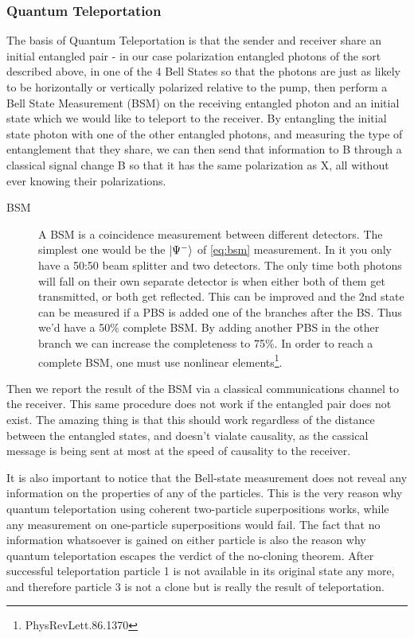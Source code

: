 \documentclass{article}
\begin{document}
\subsubsection{Quantum Teleportation}
The basis of Quantum Teleportation is that the sender and receiver share an initial entangled pair -
in our case polarization entangled photons of the sort described above, in one of the 4 Bell States
so that the photons are just as likely to be horizontally or vertically polarized relative to the pump,
then perform a Bell State Measurement (BSM) on the receiving entangled 
photon and an initial state which we would like to teleport to the receiver. 
By entangling the initial state photon with one of the other entangled photons, and measuring the type of entanglement that they
share, we can then send that information to B through a classical signal change B so that it has the same polarization as X,
all without ever knowing their polarizations.

\begin{description}
	\item[BSM] 
		A BSM is a coincidence measurement between different detectors. The simplest one would
		be the $\ket{\Psi^-}$ of \ref{eq:bsm} measurement. In it you only have a 50:50 beam splitter and two detectors. The only
		time both photons will fall on their own separate detector is when either both of them get transmitted,
		or both get reflected. This can be improved and the 2nd state can be measured if a PBS is added one 
		of the branches after the BS. Thus we'd have a 50\% complete BSM. By adding another PBS in the other 
		branch we can increase the completeness to 75\%. In order to reach a complete BSM, one must use nonlinear
		elements\footnote{PhysRevLett.86.1370}.
\end{description}

Then we report the result of the BSM via a classical communications channel to the receiver.
This same procedure does not work if the entangled pair does not exist.
The amazing thing is that this should work regardless of the distance between the entangled states,
and doesn't vialate causality, as the cassical message is being sent at most at the speed of causality to the receiver.

It is also important to notice that the Bell-state measurement does not reveal any information
on the properties of any of the particles. This is the very reason why
quantum teleportation using coherent two-particle superpositions works,
while any measurement on one-particle superpositions would fail.
The fact that no information whatsoever is gained on either particle is also the reason
why quantum teleportation escapes the verdict of the no-cloning theorem. After successful teleportation
particle 1 is not available in its original state any more,
and therefore particle 3 is not a clone but is really the result of teleportation.
\end{document}
